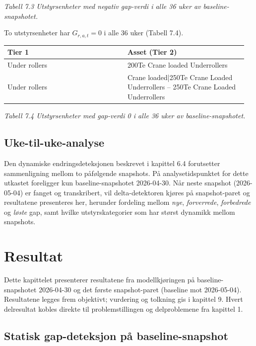 \documentclass[a4paper,11pt]{article}
\begin{document}
\begin{center}\small\textit{Tabell 7.3 Utstyrsenheter med negativ gap-verdi i alle 36 uker av baseline-snapshotet.}\end{center}

To utstyrsenheter har $G_{r,a,t} = 0$ i alle 36 uker (Tabell 7.4).

\begin{longtable}{|>{\RaggedRight}p{0.480\linewidth}|>{\RaggedRight}p{0.480\linewidth}|}
\hline
\textbf{Tier 1} & \textbf{Asset (Tier 2)} \\
\hline
\endhead
Under rollers & 200Te Crane loaded Underrollers \\
\hline
Under rollers & Crane loaded|250Te Crane Loaded Underrollers – 250Te Crane Loaded Underrollers \\
\hline
\end{longtable}

\begin{center}\small\textit{Tabell 7.4 Utstyrsenheter med gap-verdi 0 i alle 36 uker av baseline-snapshotet.}\end{center}

\subsection{Uke-til-uke-analyse}

Den dynamiske endringsdeteksjonen beskrevet i kapittel 6.4 forutsetter sammenligning mellom to påfølgende snapshots. På analysetidspunktet for dette utkastet foreligger kun baseline-snapshotet 2026-04-30. Når neste snapshot (2026-05-04) er fanget og transkribert, vil delta-detektoren kjøres på snapshot-paret og resultatene presenteres her, herunder fordeling mellom \textit{nye}, \textit{forverrede}, \textit{forbedrede} og \textit{løste} gap, samt hvilke utstyrskategorier som har størst dynamikk mellom snapshots.

\section{Resultat}

Dette kapittelet presenterer resultatene fra modellkjøringen på baseline-snapshotet 2026-04-30 og det første snapshot-paret (baseline mot 2026-05-04). Resultatene legges frem objektivt; vurdering og tolkning gis i kapittel 9. Hvert delresultat kobles direkte til problemstillingen og delproblemene fra kapittel 1.

\subsection{Statisk gap-deteksjon på baseline-snapshot}
\end{document}
